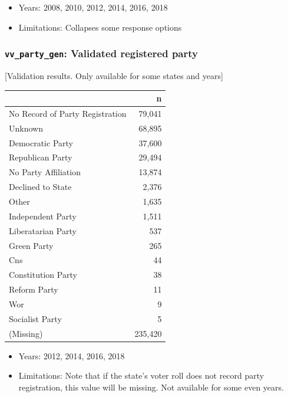 \documentclass[10pt,article,oneside]{memoir}
\theoremstyle{definition}
\begin{document}
\begin{itemize}
\tightlist
\item
  Years: 2008, 2010, 2012, 2014, 2016, 2018
\item
  Limitations: Collapses some response options
\end{itemize}

\hypertarget{vv_party_gen-validated-registered-party}{%
\subsubsection{\texorpdfstring{\texttt{vv\_party\_gen}: Validated
registered
party}{vv\_party\_gen: Validated registered party}}\label{vv_party_gen-validated-registered-party}}

{[}Validation results. Only available for some states and years{]}

\begin{table}[H]
\centering
\begin{tabular}{lr}
\toprule
 & n\\
\midrule
No Record of Party Registration & 79,041\\
Unknown & 68,895\\
Democratic Party & 37,600\\
Republican Party & 29,494\\
No Party Affiliation & 13,874\\
Declined to State & 2,376\\
Other & 1,635\\
Independent Party & 1,511\\
Liberatarian Party & 537\\
Green Party & 265\\
Cns & 44\\
Constitution Party & 38\\
Reform Party & 11\\
Wor & 9\\
Socialist Party & 5\\
(Missing) & 235,420\\
\bottomrule
\end{tabular}
\end{table}

\begin{itemize}
\tightlist
\item
  Years: 2012, 2014, 2016, 2018
\item
  Limitations: Note that if the state's voter roll does not record party
  registration, this value will be missing. Not available for some even
  years.
\end{itemize}
\end{document}
